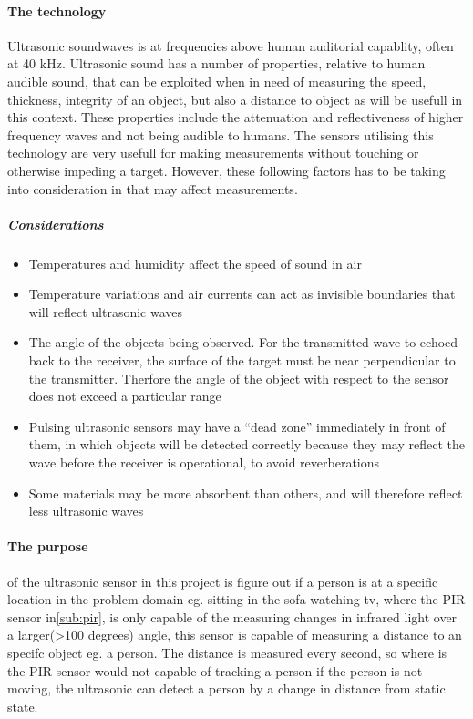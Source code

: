 \paragraph{The technology}
Ultrasonic soundwaves is at frequencies above human auditorial capablity, often at 40 kHz. Ultrasonic sound has a number of properties, relative to human audible sound, that can be exploited when in need of measuring the speed\cite{ultrasound}, thickness\cite{ultrasound2}, integrity\cite{ultrasound2} of an object, but also a distance to object as will be usefull in this context. These properties include the attenuation and reflectiveness of higher frequency waves and not being audible to humans. The sensors utilising this technology are very usefull for making measurements without touching or otherwise impeding a target. However, these following factors has to be taking into consideration in that may affect measurements.
  \subparagraph{Considerations}\label{sup:cons}
  \begin{itemize}
  \item Temperatures and humidity affect the speed of sound in air
  \item Temperature variations and air currents can act as invisible boundaries that will reflect ultrasonic waves
  \item The angle of the objects being observed. For the transmitted wave to echoed back to the receiver, the surface of the target must be  near perpendicular to the transmitter. Therfore the angle of the object with respect to the sensor does not exceed a particular range
  \item Pulsing ultrasonic sensors may have a “dead zone” immediately in front of them, in which objects will be detected correctly because they may reflect the wave before the receiver is operational, to avoid reverberations
  \item Some materials may be more absorbent than others, and will therefore reflect less ultrasonic waves
  \end{itemize}

\paragraph{The purpose} of the ultrasonic sensor in this project is figure out if a person is at a specific location in the problem domain eg. sitting in the sofa watching tv, where the PIR sensor in\cref{sub:pir}, is only capable of the measuring changes in infrared light over a larger(>100 degrees) angle, this sensor is capable of measuring a distance to an specifc object eg. a person. The distance is measured every second, so where is the PIR sensor would not capable of tracking a person if the person is not moving, the ultrasonic can detect a person by a change in distance from static state.

